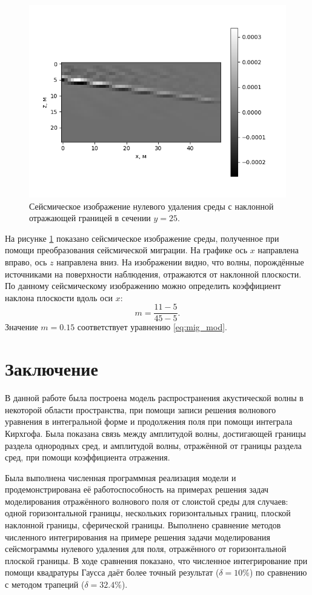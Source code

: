 \documentclass[a4paper, fontsize=14pt]{article}
\begin{document}
	
	\begin{figure}[H]
		\centering
		\includegraphics[width=.9\textwidth]{mig_tilted_central_ok.png}
		\caption{Сейсмическое изображение нулевого удаления среды с наклонной отражающей границей в сечении $y=25$.}
		\label{fig:mig_tilt}
	\end{figure}
	На рисунке \ref{fig:mig_tilt} показано сейсмическое изображение среды, полученное при помощи преобразования сейсмической миграции. 
	На графике ось $x$ направлена вправо, ось $z$ направлена вниз. На изображении видно, что волны, порождённые источниками на поверхности наблюдения, отражаются от наклонной плоскости.  По данному сейсмическому изображению можно определить коэффициент наклона плоскости вдоль оси $x$: $$m = \frac{11-5}{45-5}.$$ Значение $m=0.15$ соответствует уравнению \eqref{eq:mig_mod}. 
	
	
	
	\clearpage
	
	
	\section*{Заключение} 
	В данной работе была построена модель распространения  акустической волны в некоторой области
	 пространства, при помощи записи решения волнового уравнения в интегральной форме и продолжения поля при
	 помощи интеграла Кирхгофа. Была показана связь между амплитудой волны, достигающей границы раздела
	  однородных сред, и амплитудой волны, отражённой от границы раздела сред, при помощи коэффициента
	  отражения.
	
	Была выполнена численная программная реализация модели и продемонстрирована её работоспособность на примерах решения задач моделирования отражённого волнового поля от слоистой среды для случаев: одной горизонтальной границы, нескольких горизонтальных границ, плоской наклонной границы, сферической границы. Выполнено сравнение методов численного интегрирования на примере решения задачи моделирования сейсмограммы нулевого  удаления для поля, отражённого от горизонтальной плоской границы. В ходе сравнения показано, что численное интегрирование при помощи квадратуры Гаусса даёт более точный результат ($ \delta = 10\%$) по сравнению с методом трапеций ($\delta = 32.4\%$).
	
\end{document}
